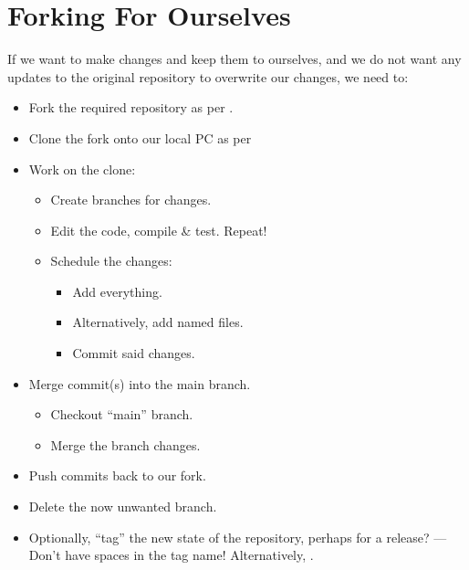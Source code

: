 \section{Forking For Ourselves}\label{sect: Fork yourself}

If we want to make changes and keep them to ourselves, and we do not want any updates to the original repository to overwrite our changes, we need to:

\begin{itemize}
    \item Fork the required repository as per .
    \item Clone the fork onto our local PC as per 
    \item Work on the clone:
    \begin{itemize}
        \item Create branches for changes. 
        \item Edit the code, compile \& test. Repeat!
        \item Schedule the changes:
        \begin{itemize}
            \item Add everything. 
            \item Alternatively, add named files. 
            \item Commit said changes. 
        \end{itemize}
    \end{itemize}
    \item Merge commit(s) into the main branch.
    \begin{itemize}
        \item Checkout ``main'' branch. 
        \item Merge the branch changes. 
    \end{itemize}
    \item Push commits back to our fork. 
    \item Delete the now unwanted branch. 
    \item Optionally, ``tag'' the new state of the repository, perhaps for a release? ---Don't have spaces in the tag name! Alternatively, .
\end{itemize}

